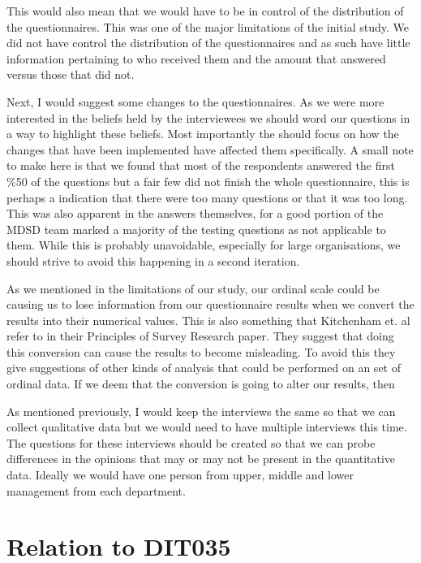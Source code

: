 \documentclass[conference]{IEEEtran}
\begin{document}
This would also mean that we would have to be in control of the distribution of the questionnaires. This was one of the major limitations of the initial study. We did not have control the distribution of the questionnaires and as such have little information pertaining to who received them and the amount that answered versus those that did not.

Next, I would suggest some changes to the questionnaires. As we were more interested in the beliefs held by the interviewees we should word our questions in a way to highlight these beliefs. Most importantly the should focus on how the changes that have been implemented have affected them specifically. A small note to make here is that we found that most of the respondents answered the first \%50 of the questions but a fair few did not finish the whole questionnaire, this is perhaps a indication that there were too many questions or that it was too long. This was also apparent in the answers themselves, for a good portion of the MDSD team marked a majority of the testing questions as not applicable to them. While this is probably unavoidable, especially for large organisations, we should strive to avoid this happening in a second iteration.

As we mentioned in the limitations of our study, our ordinal scale could be causing us to lose information from our questionnaire results when we convert the results into their numerical values. This is also something that Kitchenham et. al \cite{kitchenham2003principles} refer to in their Principles of Survey Research paper. They suggest that doing this conversion can cause the results to become misleading. To avoid this they give suggestions of other kinds of analysis that could be performed on an set of ordinal data. If we deem that the conversion is going to alter our results, then 

As mentioned previously, I would keep the interviews the same so that we can collect qualitative data but we would need to have multiple interviews this time. The questions for these interviews should be created so that we can probe differences in the opinions that may or may not be present in the quantitative data. Ideally we would have one person from upper, middle and lower management from each department.

\section{Relation to DIT035}
\end{document}
